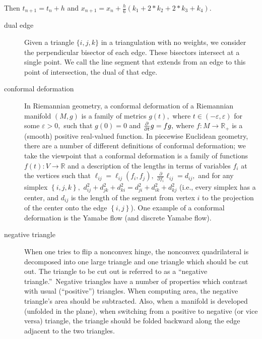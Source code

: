 \noindent Then $t_{n+1}=t_{n}+h$ and $x_{n+1}=x_{n}+\frac{h}{6}(k_{1}+2\ast
k_{2}+2\ast k_{3}+k_{4}).$

\begin{description}
\item[dual edge] Given a triangle $\{i,j,k\}$ in a triangulation with no
weights, we consider the perpendicular bisector of each edge. These
bisectors intersect at a single point. We call the line segment that extends
from an edge to this point of intersection, the dual of that edge.

\item[conformal deformation] In Riemannian geometry, a conformal deformation
of a Riemannian manifold $\left( M,g\right) $ is a family of metrics $%
g\left( t\right) ,$ where $t\in \left( -\varepsilon ,\varepsilon \right) $
for some $\varepsilon >0,$ such that $g\left( 0\right) =0$ and $\frac{%
\partial }{\partial t}g=fg,$ where $f:M\rightarrow \mathbb{R}_{+}$ is a
(smooth) positive real-valued function. In piecewise Euclidean geometry,
there are a number of different definitions of conformal deformation; we
take the viewpoint that a conformal deformation is a family of functions $%
f\left( t\right) :V\rightarrow \mathbb{R}$ and a description of the lengths
in terms of variables $f_{i}$ at the vertices such that $\ell _{ij}=\ell
_{ij}\left( f_{i},f_{j}\right) ,$ $\frac{\partial }{\partial f_{i}}\ell
_{ij}=d_{ij},$ and for any simplex $\left\{ i,j,k\right\} ,$ $%
d_{ij}^{2}+d_{jk}^{2}+d_{ki}^{2}=d_{ji}^{2}+d_{ik}^{2}+d_{kj}^{2}$ (i.e.,
every simplex has a center, and $d_{ij}$ is the length of the segment from
vertex $i$ to the projection of the center onto the edge $\left\{
i,j\right\} $). One example of a conformal deformation is the Yamabe flow
(and discrete Yamabe flow).

\item[negative triangle] When one tries to flip a nonconvex hinge, the
nonconvex quadrilateral is decomposed into one large triangle and one
triangle which should be cut out. The triangle to be cut out is referred to
as a \textquotedblleft negative triangle.\textquotedblright\ Negative
triangles have a number of properties which contrast with usual
(\textquotedblleft positive\textquotedblright ) triangles. When computing
area, the negative triangle's area should be subtracted. Also, when a
manifold is developed (unfolded in the plane), when switching from a
positive to negative (or vice versa) triangle, the triangle should be folded
backward along the edge adjacent to the two triangles.


\end{description}
